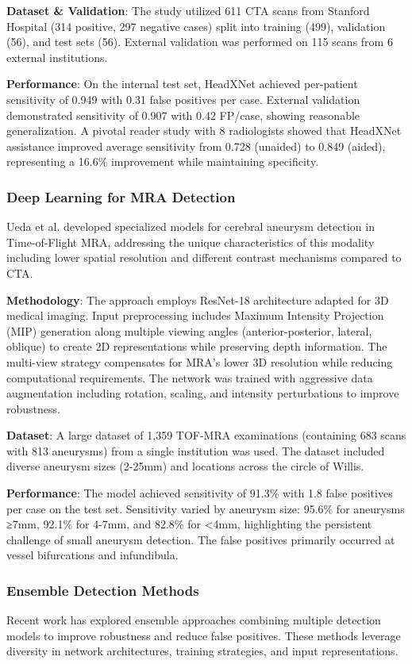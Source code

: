 \documentclass[conference]{IEEEtran}
\begin{document}
\textbf{Dataset \& Validation}: The study utilized 611 CTA scans from Stanford Hospital (314 positive, 297 negative cases) split into training (499), validation (56), and test sets (56). External validation was performed on 115 scans from 6 external institutions.

\textbf{Performance}: On the internal test set, HeadXNet achieved per-patient sensitivity of 0.949 with 0.31 false positives per case. External validation demonstrated sensitivity of 0.907 with 0.42 FP/case, showing reasonable generalization. A pivotal reader study with 8 radiologists showed that HeadXNet assistance improved average sensitivity from 0.728 (unaided) to 0.849 (aided), representing a 16.6\% improvement while maintaining specificity.

\subsubsection{Deep Learning for MRA Detection}
Ueda et al. \cite{ueda2019deep} developed specialized models for cerebral aneurysm detection in Time-of-Flight MRA, addressing the unique characteristics of this modality including lower spatial resolution and different contrast mechanisms compared to CTA.

\textbf{Methodology}: The approach employs ResNet-18 architecture adapted for 3D medical imaging. Input preprocessing includes Maximum Intensity Projection (MIP) generation along multiple viewing angles (anterior-posterior, lateral, oblique) to create 2D representations while preserving depth information. The multi-view strategy compensates for MRA's lower 3D resolution while reducing computational requirements. The network was trained with aggressive data augmentation including rotation, scaling, and intensity perturbations to improve robustness.

\textbf{Dataset}: A large dataset of 1,359 TOF-MRA examinations (containing 683 scans with 813 aneurysms) from a single institution was used. The dataset included diverse aneurysm sizes (2-25mm) and locations across the circle of Willis.

\textbf{Performance}: The model achieved sensitivity of 91.3\% with 1.8 false positives per case on the test set. Sensitivity varied by aneurysm size: 95.6\% for aneurysms ≥7mm, 92.1\% for 4-7mm, and 82.8\% for <4mm, highlighting the persistent challenge of small aneurysm detection. The false positives primarily occurred at vessel bifurcations and infundibula.

\subsubsection{Ensemble Detection Methods}
Recent work has explored ensemble approaches combining multiple detection models to improve robustness and reduce false positives. These methods leverage diversity in network architectures, training strategies, and input representations.
\end{document}
